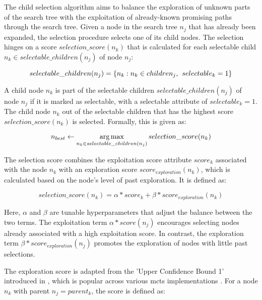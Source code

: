 The child selection algorithm aims to balance the exploration of unknown parts of the search tree with the exploitation of already-known promising paths through the search tree. Given a node in the search tree $n_j$ that has already been expanded, the selection procedure selects one of its child nodes. The selection hinges on a score $selection\_score(n_k)$ that is calculated for each selectable child $n_k \in selectable\_children(n_j)$ of node $n_j$:

\begin{equation}
    selectable\_children(n_j) = \{n_k: n_k \in children_j, \hspace{1.5mm} selectable_k = 1\}
\end{equation}

A child node $n_k$ is part of the selectable children $selectable\_children(n_j)$ of node $n_j$ if it is marked as selectable, with a selectable attribute of $selectable_k = 1$. The child node $n_k$ out of the selectable children that has the highest score $selection\_score(n_k)$ is selected. Formally, this is given as:

\begin{equation}
    n_{best} \gets \operatorname*{arg\,max}_{n_k \in selectable\_children(n_j)} selection\_score(n_k)
\end{equation}

The selection score combines the exploitation score attribute $score_k$ associated with the node $n_k$ with an exploration score $score_{exploration}(n_k)$, which is calculated based on the node's level of past exploration. It is defined as:

\begin{equation}
    selection\_score(n_k) = \alpha * score_k + \beta * score_{exploration}(n_k)
\end{equation}

Here, $\alpha$ and $\beta$ are tunable hyperparameters that adjust the balance between the two terms. The exploitation term $\alpha * score(n_j)$ encourages selecting nodes already associated with a high exploitation score. In contrast, the exploration term $\beta * score_{exploration}(n_j)$ promotes the exploration of nodes with little past selections.

The exploration score is adapted from the 'Upper Confidence Bound 1' introduced in \cite{auer_finite-time_2002}, which is popular across various \gls{mcts} implementations \cite{kocsis_bandit_2006, browne_survey_2012}. For a node $n_k$ with parent $n_j = parent_k$, the score is defined as:

